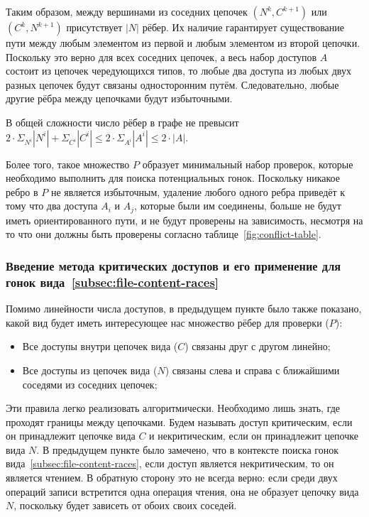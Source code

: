 Таким образом, между вершинами из соседних цепочек $(N^k, C^{k+1})$ или $(C^k, N^{k+1})$ присутствует $|N|$ рёбер. Их наличие гарантирует существование пути между любым элементом из первой и любым элементом из второй цепочки. Поскольку это верно для всех соседних цепочек, а весь набор доступов $A$ состоит из цепочек чередующихся типов, то любые два доступа из любых двух разных цепочек будут связаны односторонним путём. Следовательно, любые другие рёбра между цепочками будут избыточными.

В общей сложности число рёбер в графе не превысит $2 \cdot \Sigma_{N^i} |N^i| + \Sigma_{C^i} |C^i| \leq 2 \cdot \Sigma_{A^i} |A^i| \leq 2 \cdot |A|$.

Более того, такое множество $P$ образует минимальный набор проверок, которые необходимо выполнить для поиска потенциальных гонок. Поскольку никакое ребро в $P$ не является избыточным, удаление любого одного ребра приведёт к тому что два доступа $A_i$ и $A_j$, которые были им соединены, больше не будут иметь ориентированного пути, и не будут проверены на зависимость, несмотря на то что они должны быть проверены согласно таблице~\ref{fig:conflict-table}.

\subsubsection{Введение метода критических доступов и его применение для гонок вида~\ref{subsec:file-content-races}}

Помимо линейности числа доступов, в предыдущем пункте было также показано, какой вид будет иметь интересующее нас множество рёбер для проверки ($P$):

\begin{itemize}
    \item Все доступы внутри цепочек вида ($C$) связаны друг с другом линейно;
    \item Все доступы из цепочек вида ($N$) связаны слева и справа с ближайшими соседями из соседних цепочек;
\end{itemize}

Эти правила легко реализовать алгоритмически. Необходимо лишь знать, где проходят границы между цепочками. Будем называть доступ критическим, если он принадлежит цепочке вида $C$ и некритическим, если он принадлежит цепочке вида $N$. В предыдущем пункте было замечено, что в контексте поиска гонок вида~\ref{subsec:file-content-races}, если доступ является некритическим, то он является чтением. В обратную сторону это не всегда верно: если среди двух операций записи встретится одна операция чтения, она не образует цепочку вида $N$, поскольку будет зависеть от обоих своих соседей.

